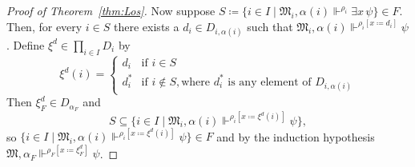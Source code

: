 \documentclass[10pt,a4paper]{amsart}
\newcommand{\mo}{\mathfrak}
\newcommand{\satisfySym}{\Vdash}
\newcommand{\satisfy}[4]{#1, #2 \satisfySym^{#4} #3}
\begin{document}
\begin{proof}[Proof of Theorem~\ref{thm:Los}]
    Now suppose
    $S \coloneq \{ i \in I \mid \satisfy{\mo{M}_i}{\alpha(i)}{\exists x\,\psi}{\rho_i}\} \in F$. 
    Then, for every $i \in S$ there exists a $d_i \in D_{i,\alpha(i)}$
    such that $\satisfy{\mo{M}_i}{\alpha(i)}{\psi}{\rho_i[x \coloneq d_i]}$.
    Define $\xi^d \in \prod_{i \in I} D_i$ by
    \begin{equation*}
      \xi^d(i)
        = \begin{cases}
            d_i   &\text{if } i \in S \\
            d^*_i &\text{if } i \not\in S, \text{where } d^*_i \text{ is any element of } D_{i,\alpha(i)}
          \end{cases}
    \end{equation*}
    Then $\xi^d_F \in D_{\alpha_F}$ and
    \begin{equation*}
      S \subseteq \{ i \in I \mid \satisfy{\mo{M}_i}{\alpha(i)}{\psi}{\rho_i[x \coloneq \xi^d(i)]} \},
    \end{equation*}
    so $\{ i \in I \mid \satisfy{\mo{M}_i}{\alpha(i)}{\psi}{\rho_i[x \coloneq \xi^d(i)]} \} \in F$
    and by the induction hypothesis $\satisfy{\mo{M}}{\alpha_F}{\psi}{\rho_F[x \coloneq \xi^d_F]}$.
\end{proof}
\end{document}
